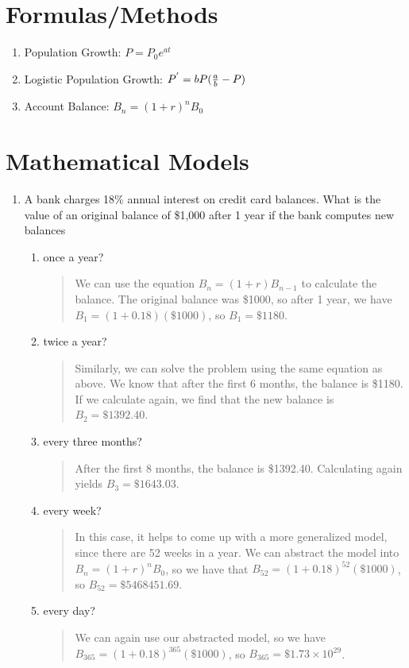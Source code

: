 \documentclass{hw}
\begin{document}
\section{Formulas/Methods}
\begin{enumerate}
\item Population Growth: $P = P_{0}e^{at}$
\item Logistic Population Growth: $P^{'}=bP({a\over b}-P)$
\item Account Balance: $B_{n}=(1+r)^nB_{0}$
\end{enumerate}

\newpage

\section{Mathematical Models}
\begin{enumerate}
\item A bank charges 18\% annual interest on credit card balances. What is the value of an original
balance of \$1,000 after 1 year if the bank computes new balances
\begin{enumerate}
\item once a year?
\begin{quote}
We can use the equation $B_{n} = (1+r)B_{n-1}$ to calculate the balance. The original balance was \$1000,
so after 1 year, we have $B_{1} = (1+0.18)(\$1000)$, so $B_{1}=\$1180$.
\end{quote}
\item twice a year?
\begin{quote}
Similarly, we can solve the problem using the same equation as above. We know that after the first 6
months, the balance is \$1180. If we calculate again, we find that the new balance is $B_{2}=\$1392.40$.
\end{quote}
\item every three months?
\begin{quote}
After the first 8 months, the balance is \$1392.40. Calculating again yields $B_{3}=\$1643.03$.
\end{quote}
\item every week?
\begin{quote}
In this case, it helps to come up with a more generalized model, since there are 52 weeks in a year.
We can abstract the model into $B_{n}=(1+r)^nB_{0}$, so we have that $B_{52}=(1+0.18)^{52}(\$1000)$,
so $B_{52} = \$5468451.69$.
\end{quote}
\item every day?
\begin{quote}
We can again use our abstracted model, so we have $B_{365} = (1+0.18)^{365}(\$1000)$, so
$B_{365} = \$1.73\times10^{29}$.
\end{quote}
\end{enumerate}
\end{enumerate}
\end{document}
